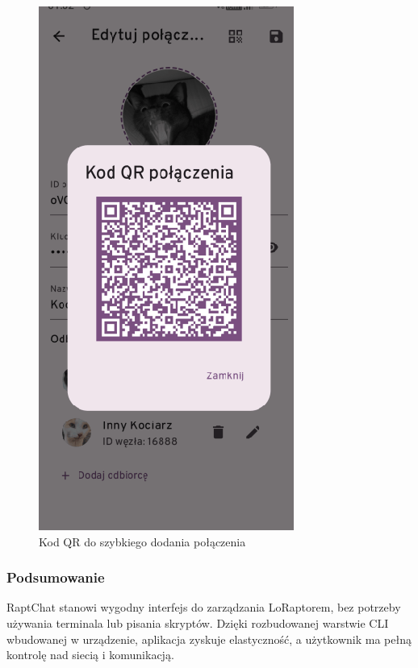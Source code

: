 \begin{figure}[H]
	\centering
	\begin{minipage}[b]{0.45\textwidth}
		\centering
		\includegraphics[width=\textwidth]{root/raptchat_qr.png}
		\caption{Kod QR do szybkiego dodania połączenia}
	\end{minipage}
\end{figure}

\clearpage
\subsubsection{Podsumowanie}

RaptChat stanowi wygodny interfejs do zarządzania LoRaptorem, bez potrzeby używania terminala lub pisania skryptów. Dzięki rozbudowanej warstwie CLI wbudowanej w urządzenie, aplikacja zyskuje elastyczność, a użytkownik ma pełną kontrolę nad siecią i komunikacją.